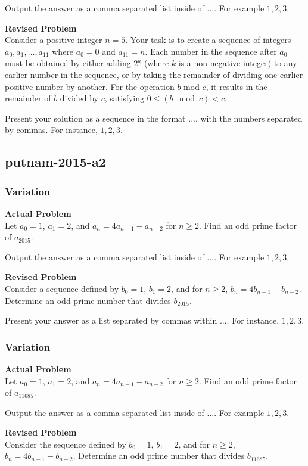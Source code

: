 Output the answer as a comma separated list inside of $\boxed{...}$. For example $\boxed{1, 2, 3}$.

\textbf{Revised Problem}\\
Consider a positive integer $n = 5$. Your task is to create a sequence of integers $a_0, a_1, \ldots, a_{11}$ where $a_0 = 0$ and $a_{11} = n$. Each number in the sequence after $a_0$ must be obtained by either adding $2^k$ (where $k$ is a non-negative integer) to any earlier number in the sequence, or by taking the remainder of dividing one earlier positive number by another. For the operation $b$ mod $c$, it results in the remainder of $b$ divided by $c$, satisfying $0 \leq (b \mod c) < c$.

Present your solution as a sequence in the format $\boxed{...}$, with the numbers separated by commas. For instance, $\boxed{1, 2, 3}$.

\subsection{putnam-2015-a2}
\subsubsection{Variation}
\textbf{Actual Problem}\\
Let $a_0=1$, $a_1=2$, and $a_n=4a_{n-1}-a_{n-2}$ for $n\geq 2$. Find an odd prime factor of $a_{2015}$.

Output the answer as a comma separated list inside of $\boxed{...}$. For example $\boxed{1, 2, 3}$.

\textbf{Revised Problem}\\
Consider a sequence defined by $b_0=1$, $b_1=2$, and for $n\geq 2$, $b_n=4b_{n-1}-b_{n-2}$. Determine an odd prime number that divides $b_{2015}$.

Present your answer as a list separated by commas within $\boxed{...}$. For instance, $\boxed{1, 2, 3}$.

\subsubsection{Variation}
\textbf{Actual Problem}\\
Let $a_0=1$, $a_1=2$, and $a_n=4a_{n-1}-a_{n-2}$ for $n\geq 2$. Find an odd prime factor of $a_{11685}$.

Output the answer as a comma separated list inside of $\boxed{...}$. For example $\boxed{1, 2, 3}$.

\textbf{Revised Problem}\\
Consider the sequence defined by $b_0=1$, $b_1=2$, and for $n\geq 2$, $b_n=4b_{n-1}-b_{n-2}$. Determine an odd prime number that divides $b_{11685}$.

